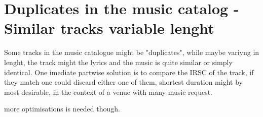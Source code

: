 \section{Duplicates in the music catalog - Similar tracks variable lenght}
\label{sub:duplicates}

Some tracks in the music catalogue might be "duplicates", while maybe variyng in lenght, the track might the lyrics and the music is quite similar or simply identical. One imediate partwise solution is to compare the IRSC of the track, if they match one could discard either one of them, shortest duration might by most desirable, in the context of a venue with many music request.

more optimisations is needed though.